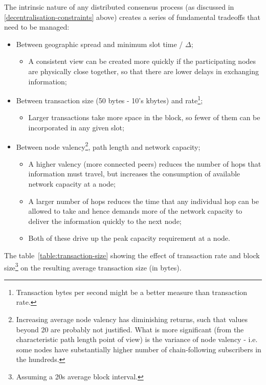 \documentclass[11pt,a4paper]{article}
\begin{document}
The intrinsic nature of any distributed consensus process (as discussed
in \cref{decentralisation-constraints} above)
creates a series of fundamental tradeoffs that need to be managed:

\begin{itemize}
\item
  Between geographic spread and minimum slot time / $\Delta$;

  \begin{itemize}
  \item
    A consistent view can be created more quickly if the participating
    nodes are physically close together, so that there are lower delays
    in exchanging information;
  \end{itemize}
\item
  Between transaction size (50 bytes - 10's kbytes) and rate\footnote{Transaction
    bytes per second might be a better measure than transaction rate.};

  \begin{itemize}
  \item
    Larger transactions take more space in the block, so fewer of them
    can be incorporated in any given slot;
  \end{itemize}
\item
  Between node valency\footnote{Increasing average node valency has
    diminishing returns, such that values beyond 20 are probably not
    justified. What is more significant (from the characteristic path
    length point of view) is the variance of node valency - i.e. some
    nodes have substantially higher number of chain-following
    subscribers in the hundreds.}, path length and network capacity;

  \begin{itemize}
  \item
    A higher valency (more connected peers) reduces the number of hops
    that information must travel, but increases the consumption of
    available network capacity at a node;
  \item
    A larger number of hops reduces the time that any individual hop can
    be allowed to take and hence demands more of the network capacity to
    deliver the information quickly to the next node;
  \item
    Both of these drive up the peak capacity requirement at a node.
  \end{itemize}
\end{itemize}

The table~\ref{table:transaction-size} showing the effect of
transaction rate and block size\footnote{Assuming a 20s average block
interval.} on the resulting average transaction size (in bytes).
\end{document}

